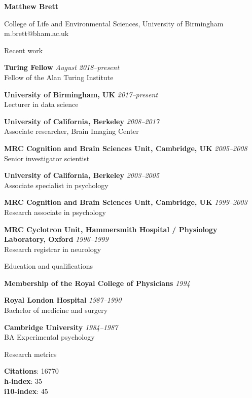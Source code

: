 \documentclass[11pt]{cv}
\newcommand{\PlaceDate}[2]{{\bf #1} \hfill {\em #2} \\}
\newcommand{\PlaceDateNote}[3]{{\bf #1} \hfill {\em #2} \\#3}
\newcommand{\UCB}{University of California, Berkeley}
\newcommand{\UoB}{University of Birmingham, UK}
\newcommand{\CBU}{MRC Cognition and Brain Sciences Unit, Cambridge, UK}
\begin{document}
{\huge \bf Matthew Brett}

College of Life and Environmental Sciences, University of Birmingham \\
m.brett@bham.ac.uk

\begin{cvSection}{Recent work}

\PlaceDateNote{Turing Fellow}{August 2018--present}
    {Fellow of the Alan Turing Institute}

\PlaceDateNote{\UoB}{2017--present }{
Lecturer in data science}

\PlaceDateNote{\UCB}{2008--2017 }{
Associate researcher, Brain Imaging Center}

\PlaceDateNote{\CBU}{2005--2008}{
    Senior investigator scientist}

\PlaceDateNote{\UCB}{2003--2005 }{
    Associate specialist in psychology}

\PlaceDateNote{\CBU}{1999--2003 }{
    Research associate in psychology}

\PlaceDateNote{
MRC Cyclotron Unit, Hammersmith Hospital / Physiology Laboratory, Oxford}
{1996--1999}
    {Research registrar in neurology}

\end{cvSection}

\begin{cvSection}{Education and qualifications}

{\bf Membership of the Royal College of Physicians} \hfill {\em 1994}

\PlaceDate{Royal London Hospital}{1987--1990 }
Bachelor of medicine and surgery

\PlaceDateNote{Cambridge University}{1984--1987 }{
BA Experimental psychology}

\end{cvSection}

\begin{cvSection}{Research metrics}

{\bf Citations}: 16770 \\
{\bf h-index}: 35 \\
{\bf i10-index}: 45

\end{cvSection}
\end{document}

